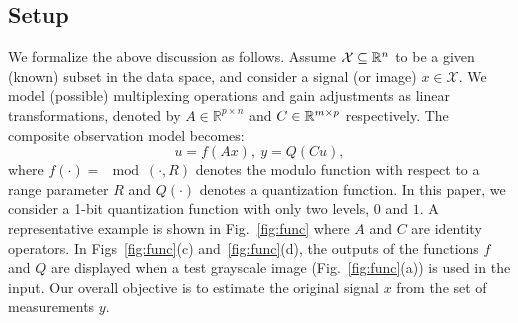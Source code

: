 \subsection{Setup}

We formalize the above discussion as follows. Assume $\mathcal{X} \subseteq {\mathbb{R}}^{n}$ to be a given (known) subset in the data space, and consider a signal (or image) $x \in \mathcal{X}$. We model (possible) multiplexing operations and gain adjustments as linear transformations, denoted by $A\in\mathbb{R}^{p\times n}$ and $C\in{\mathbb{R}}^{m\times p}$ respectively. The composite observation model becomes:
\begin{equation}
\label{quan_obs}
u=f(Ax),~y=Q(Cu),
\end{equation}
where $f(\cdot)=\mod(\cdot,R)$ denotes the modulo function with respect to a range parameter $R$ and $Q(\cdot)$ denotes a quantization function. In this paper, we consider a 1-bit quantization function with only two levels, $0$ and $1$. A representative example is shown in Fig.\ \ref{fig:func} where $A$ and $C$ are identity operators. In  Figs~\ref{fig:func}(c)  and~\ref{fig:func}(d), the outputs of the functions $f$ and $Q$ are displayed when a test grayscale image (Fig.\ \ref{fig:func}(a)) is used in the input. Our overall objective is to estimate the original signal $x$ from the set of measurements $y$. 

